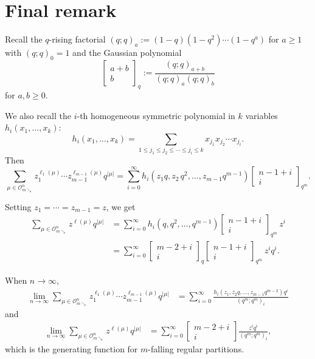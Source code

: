 \documentclass[11pt,reqno]{amsart}
\numberwithin{equation}{section}
\theoremstyle{plain}
\theoremstyle{definition}
\newcommand{\OO}{\mathcal{O}}
\newcommand\qbin[2]{{\left[\begin{matrix} #1 \\ #2 \end{matrix} \right]}}
\begin{document}
\section{Final remark}\label{sec4: outlook}

Recall the $q$-rising factorial $(q;q)_a:=(1-q)(1-q^2)\cdots (1-q^a)$ for $a\ge 1$ with $(q;q)_0=1$ and
 the Gaussian polynomial
\begin{equation*}
\qbin{a+b}{b}_q:= \frac{(q;q)_{a+b}}{(q;q)_{a}(q;q)_{b}}
\end{equation*}
for $a,b\ge 0$.

We also recall the $i$-th homogeneous symmetric polynomial  in $k$ variables $h_i (x_1,\ldots, x_{k})$:
\begin{equation*}
h_{i}(x_1,\ldots, x_{k})=\sum_{1\le j_1\le j_2\le \cdots \le j_i \le k} x_{j_1} x_{j_2} \cdots x_{j_i}.
\end{equation*}
Then
\begin{equation*}
\sum_{\mu\in\OO_{m\searrow}^n} z_1^{\ell_1(\mu)}\cdots z_{m-1}^{\ell_{m-1}(\mu)}q^{|\mu|}=\sum_{i=0}^{\infty} {h_i(z_1q,z_2\, q^2,\ldots, z_{m-1}q^{m-1}) }\qbin{n-1+i}{i}_{q^m}.
\end{equation*}

Setting $z_1=\cdots =z_{m-1}=z$, we get
\begin{align}\label{gf for OO_m^n}
 \sum_{\mu\in\OO_{m\searrow}^n} z^{\ell(\mu)} q^{|\mu|} &=\sum_{i=0}^{\infty}h_i (q, q^2,\ldots, q^{m-1}) \qbin{n-1+i}{i}_{q^m}\, z^i\nonumber \\
 &=\sum_{i=0}^{\infty} \left[\begin{matrix} m-2+ i \\ i  \end{matrix}\right]_q \qbin{n-1+i}{i}_{q^m}\, z^iq^i.
\end{align}

When $n \to \infty$,
\begin{align*}
\lim_{n \to \infty} \sum_{\mu\in\OO_{m\searrow}^n} z_1^{\ell_1(\mu)}\cdots z_{m-1}^{\ell_{m-1}(\mu)}q^{|\mu|}&=\sum_{i=0}^{\infty} \frac{{h_i (z_1,z_2q,\ldots, z_{m-1} q^{m-2} )} q^i}{(q^m;q^m)_i}
\end{align*}
and
\begin{align*}
\lim_{n \to \infty} \sum_{\mu\in\OO_{m\searrow}^n} z^{\ell(\mu)} q^{|\mu|}&=\sum_{i=0}^{\infty}  \qbin{m-2+i}{i} \frac{z^i q^i}{(q^m;q^m)_i},
\end{align*}
which is the generating function for $m$-falling regular partitions.
\end{document}
